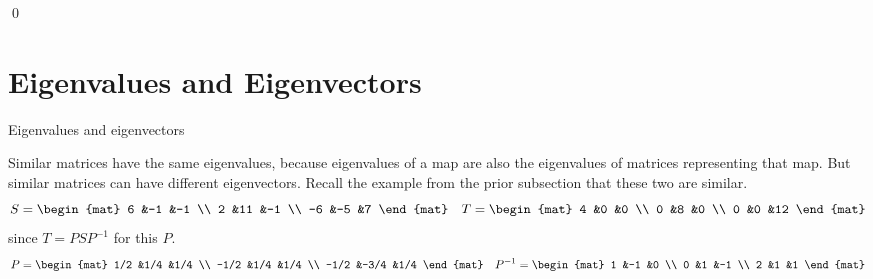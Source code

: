 \documentclass[10pt,t,serif,professionalfont]{beamer}
\begin{document}
\begin{frame}
\lm[lm:DiagIffBasisOfEigens]

\pause
\pf
{}  
\qed
\end{frame}




\section{Eigenvalues and Eigenvectors}
\begin{frame}{Eigenvalues and eigenvectors}

\pause
\df[df:EigenOfMatrix]

\no
Similar matrices have the same eigenvalues, because
eigenvalues of a map are also the eigenvalues of matrices representing
that map.
But similar matrices can have different eigenvectors.
\ex
Recall the example from the prior subsection that these two are similar.
\begin{equation*}
  S=
  \begin{mat}
    6 &-1  &-1 \\
    2 &11  &-1 \\
   -6 &-5  &7
  \end{mat}
  \quad
  T=
  \begin{mat}
    4 &0 &0 \\
    0 &8 &0 \\
    0 &0 &12
  \end{mat}
\end{equation*}
since $T=PSP^{-1}$ for this $P$.
\begin{equation*}
  P=
  \begin{mat}
    1/2 &1/4  &1/4 \\
   -1/2 &1/4  &1/4 \\
   -1/2 &-3/4 &1/4
  \end{mat}
  \quad
  P^{-1}=
  \begin{mat}
    1 &-1 &0 \\
    0 &1 &-1 \\
    2 &1 &1
  \end{mat}
\end{equation*}
\end{frame}
\end{document}
